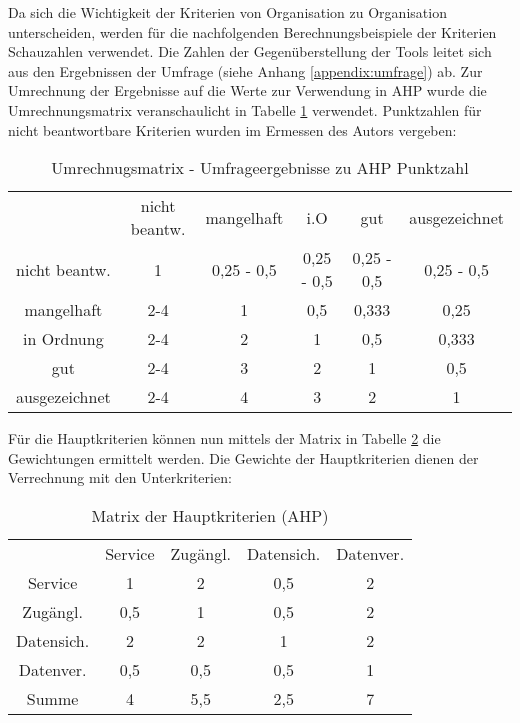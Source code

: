 Da sich die Wichtigkeit der Kriterien von Organisation zu Organisation unterscheiden, werden für die nachfolgenden Berechnungsbeispiele der Kriterien Schauzahlen verwendet. Die Zahlen der Gegenüberstellung der Tools leitet sich aus den Ergebnissen der Umfrage (siehe Anhang \ref{appendix:umfrage}) ab. Zur Umrechnung der Ergebnisse auf die Werte zur Verwendung in AHP wurde die Umrechnungsmatrix veranschaulicht in Tabelle \ref{tab:umrechMatrix} verwendet. Punktzahlen für nicht beantwortbare Kriterien wurden im Ermessen des Autors vergeben:

\begin{table}[h]
	\centering
  \begin{tabular}{cccccc}
    & nicht beantw. & mangelhaft & i.O & gut & ausgezeichnet \\
    nicht beantw. & 1 & 0,25 - 0,5 & 0,25 - 0,5 & 0,25 - 0,5 & 0,25 - 0,5 \\
    mangelhaft & 2-4 & 1 & 0,5 & 0,333 & 0,25 \\
    in Ordnung & 2-4 & 2 & 1 & 0,5 & 0,333 \\
    gut & 2-4 & 3 & 2 & 1 & 0,5 \\
    ausgezeichnet & 2-4 & 4 & 3 & 2 & 1 \\
    \end{tabular} 
	\caption{Umrechnugsmatrix - Umfrageergebnisse zu AHP Punktzahl}
	\label{tab:umrechMatrix}
\end{table}

Für die Hauptkriterien können nun mittels der Matrix in Tabelle \ref{tab:MatrixHauptkriterien} die Gewichtungen ermittelt werden. Die Gewichte der Hauptkriterien dienen der Verrechnung mit den Unterkriterien: 

\begin{table}[h]
	\centering
\begin{tabular}{ccccc}
  & Service & Zugängl. & Datensich. & Datenver. \\
  Service & 1 & 2 & 0,5 & 2 \\
  Zugängl. & 0,5 & 1 & 0,5 & 2 \\
  Datensich. & 2 & 2 & 1 & 2 \\
  Datenver. & 0,5 & 0,5 & 0,5 & 1 \\
  Summe & 4 & 5,5 & 2,5 & 7 \\
  \end{tabular} 
	\caption{ Matrix der Hauptkriterien (AHP)}
	\label{tab:MatrixHauptkriterien}
\end{table}

